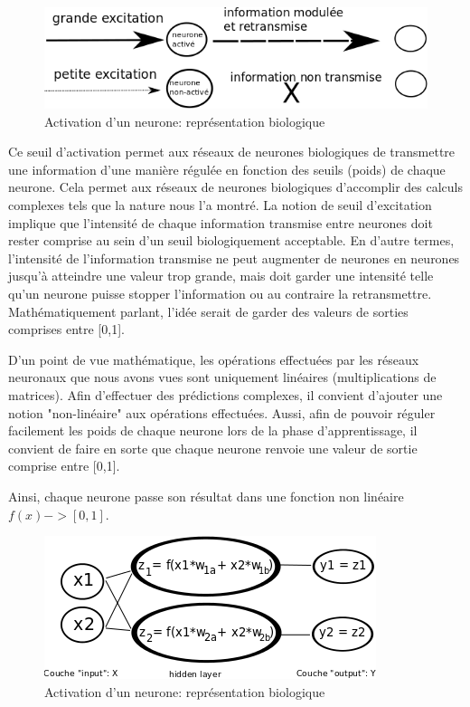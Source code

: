 \documentclass[11pt,a4paper]{report}
\begin{document}
    \begin{figure}[!h]
    \center
    \includegraphics[scale=0.74]{ressources/nn_theory_4.png}
    \caption{Activation d'un neurone: représentation biologique}
    \end{figure} 
    
    \par Ce seuil d'activation permet aux réseaux de neurones biologiques de transmettre une information d'une manière régulée en fonction des seuils (poids) de chaque neurone. Cela permet aux réseaux de neurones biologiques d'accomplir des calculs complexes tels que la nature nous l'a montré. La notion de seuil d'excitation implique que l'intensité de chaque information transmise entre neurones doit rester comprise au sein d'un seuil biologiquement acceptable. En d'autre termes, l'intensité de l'information transmise ne peut augmenter de neurones en neurones jusqu'à atteindre une valeur trop grande, mais doit garder une intensité telle qu'un neurone puisse stopper l'information ou au contraire la retransmettre. Mathématiquement parlant, l'idée serait de garder des valeurs de sorties comprises entre [0,1]. 
    
    \par D'un point de vue mathématique, les opérations effectuées par les réseaux neuronaux que nous avons vues sont uniquement linéaires (multiplications de matrices). Afin d'effectuer des prédictions complexes, il convient d'ajouter une notion "non-linéaire" aux opérations effectuées. Aussi, afin de pouvoir réguler facilement les poids de chaque neurone lors de la phase d'apprentissage, il convient de faire en sorte que chaque neurone renvoie une valeur de sortie comprise entre [0,1]. 
    
    \par Ainsi, chaque neurone passe son résultat dans une fonction non linéaire $f(x) -> [0,1]$. 
    
    \begin{figure}[!h]
    \center
    \includegraphics[scale=0.74]{ressources/nn_theory_5.png}
    \caption{Activation d'un neurone: représentation biologique}
    \end{figure} 
    
\end{document}

